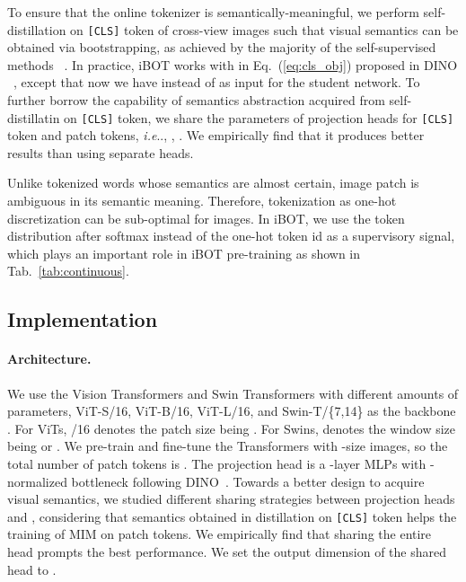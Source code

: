 \documentclass{article} \usepackage{iclr2022_conference,times}
\makeatletter
\def\ourmethod{{iBOT}\xspace}
\DeclareRobustCommand\onedot{\futurelet\@let@token\@onedot}
\def\@onedot{\ifx\@let@token.\else.\null\fi\xspace}
\def\ie{\emph{i.e}\onedot} \def\Ie{\emph{I.e}\onedot}
\makeatother
\begin{document}
To ensure that the online tokenizer is semantically-meaningful, we perform self-distillation on \texttt{[CLS]} token of cross-view images such that visual semantics can be obtained via bootstrapping, as achieved by the majority of the self-supervised methods ~\citep{moco,byol,dino}. 
In practice, \ourmethod works with  in Eq.~(\ref{eq:cls_obj}) proposed in DINO ~\citep{dino}, except that now we have  instead of  as input for the student network. To further borrow the capability of semantics abstraction acquired from self-distillatin on \texttt{[CLS]} token, we share the parameters of projection heads for \texttt{[CLS]} token and patch tokens, \ie, , . We empirically find that it produces better results than using separate heads.

Unlike tokenized words whose semantics are almost certain, image patch is ambiguous in its semantic meaning. Therefore, tokenization as one-hot discretization can be sub-optimal for images. 
In \ourmethod, we use the token distribution after softmax instead of the one-hot token id as a supervisory signal, which plays an important role in \ourmethod pre-training as shown in Tab.~\ref{tab:continuous}. 


\subsection{Implementation}
\label{sec:implementation}

\paragraph{Architecture.} 
We use the Vision Transformers \citep{vit} and Swin Transformers \citep{swin} with different amounts of parameters, ViT-S/16, ViT-B/16, ViT-L/16, and Swin-T/\{7,14\} as the backbone . For ViTs, /16 denotes the patch size being . For Swins,  denotes the window size being  or .
We pre-train and fine-tune the Transformers with -size images, so the total number of patch tokens is . The projection head  is a -layer 
MLPs
with -normalized bottleneck following DINO~\citep{dino}. 
Towards a better design to acquire visual semantics, we studied different sharing strategies between projection heads  and , considering that semantics obtained in distillation on \texttt{[CLS]} token helps the training of MIM on patch tokens. We empirically find that sharing the entire head prompts the best performance. 
We set the output dimension of the shared head to .
\end{document}

